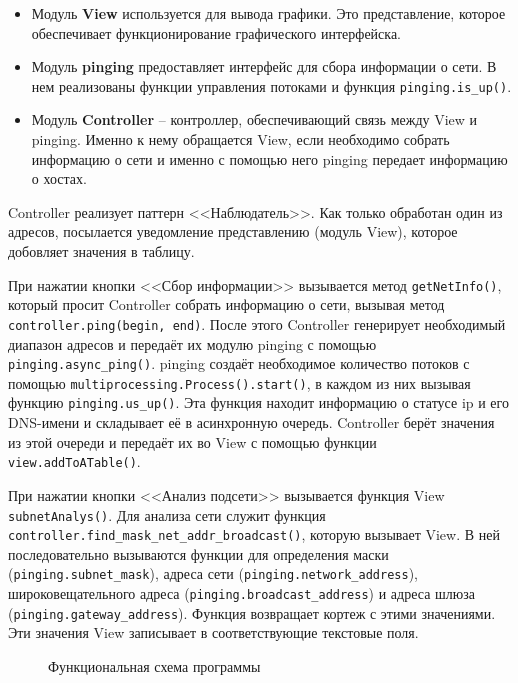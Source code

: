 \documentclass[a4paper]{article}
\begin{document}
		\begin{itemize}
			\item Модуль \textbf{View} используется для вывода графики. Это представление, которое обеспечивает функционирование графического интерфейска.
			\item Модуль \textbf{pinging} предоставляет интерфейс для сбора информации о сети. В нем реализованы функции управления потоками и функция \texttt{pinging.is\_up()}.
			\item Модуль \textbf{Controller} -- контроллер, обеспечивающий связь между View и pinging. Именно к нему обращается View, если необходимо собрать информацию о сети и именно с помощью него pinging передает информацию о хостах.	
		\end{itemize}
		
		Controller реализует паттерн <<Наблюдатель>>. Как только обработан один из адресов, посылается уведомление представлению (модуль View), которое добовляет значения в таблицу.
		
		При нажатии кнопки <<Сбор информации>> вызывается метод \texttt{getNetInfo()}, который просит Controller собрать информацию о сети, вызывая метод \texttt{controller.ping(begin, end)}. После этого Controller генерирует необходимый диапазон адресов и передаёт их модулю pinging с помощью \texttt{pinging.async\_ping()}. pinging создаёт необходимое количество потоков с помощью \texttt{multiprocessing.Process().start()}, в каждом из них вызывая функцию \texttt{pinging.us\_up()}. Эта функция находит информацию о статусе ip и его DNS-имени и складывает её в асинхронную очередь. Controller берёт значения из этой очереди и передаёт их во View с помощью функции \texttt{view.addToATable()}. 
		
		При нажатии кнопки <<Анализ подсети>> вызывается функция View \texttt{subnetAnalys()}. Для анализа сети служит функция \texttt{controller.find\_mask\_net\_addr\_broadcast()}, которую вызывает View. В ней последовательно вызываются функции для определения маски (\texttt{pinging.subnet\_mask}), адреса сети (\texttt{pinging.network\_address}), широковещательного адреса (\texttt{pinging.broadcast\_address}) и адреса шлюза (\texttt{pinging.gateway\_address}). Функция возвращает кортеж с этими значениями. Эти значения View записывает в соответствующие текстовые поля.
		
		\begin{figure}[H]
			\caption{Функциональная схема программы}
		\end{figure}
		
\end{document}
